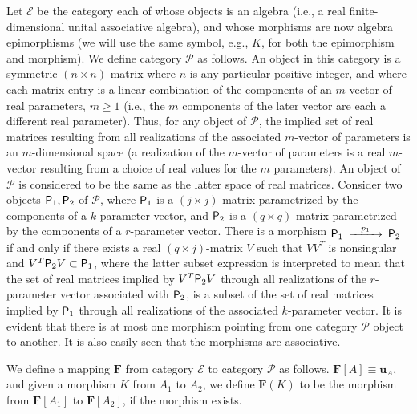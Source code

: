 \documentclass{amsart}
\numberwithin{equation}{section}
\theoremstyle{definition}
\numberwithin{theorem}{section}
\begin{document}
Let $\mathcal{E}$ be the category each of whose objects is an algebra (i.e., a real finite-dimensional unital associative algebra), and whose morphisms are now algebra epimorphisms (we will use the same symbol, e.g., $K$, for both the epimorphism and morphism).  We define category $\mathcal{P}$ as follows. An object in this category is a symmetric $(n\times n)$-matrix where $n$ is any particular positive integer, and where each matrix entry is a linear combination of the components of an $m$-vector of real parameters, $m\ge 1$ (i.e., the $m$ components of the later vector are each a different real parameter).  Thus, for any object of $\mathcal{P}$, the implied set of real matrices resulting from all realizations of the associated $m$-vector of parameters is an $m$-dimensional space (a realization of the $m$-vector of parameters is a real $m$-vector resulting from a choice of real values for the $m$ parameters).  An object of $\mathcal{P}$ is considered to be the same as the latter space of real matrices.  Consider two objects ${\sf P}_1,{\sf P}_2$ of $\mathcal{P}$, where ${\sf P}_1$ is a $(j\times j)$-matrix parametrized by the components of a $k$-parameter vector, and ${\sf P}_2$ is a $(q\times q)$-matrix parametrized by the components of a $r$-parameter vector.  There is a morphism $ \begin{CD}  {\sf P}_1 @>p_1>> {\sf P}_2\end{CD}$ if and only if  there exists a real $(q\times j)$-matrix $V$ such that $VV^T$ is nonsingular and $V^T{\sf P}_2V\subset {\sf P}_1$, where the latter subset expression is 
interpreted to mean that the set of real matrices implied by $V^T{\sf P}_2V$ through all realizations of the $r$-parameter vector associated with ${\sf P}_2$, is a subset of  the set of real matrices implied by  ${\sf P}_1$ through all realizations of the associated $k$-parameter vector.  It is evident that there is at most one morphism pointing from one category $\mathcal{P}$ object to another.  It is also easily seen that the morphisms are associative.  

We define a mapping $\mathbf{F}$ from category $\mathcal{E}$ to category $\mathcal{P}$ as follows.  $\mathbf{F}[
A] \equiv \mathbf{u}_A$, and given a morphism $K$ from $A_1$ to $A_2$, we define $\mathbf{F}(K)$ to be the morphism from $\mathbf{F}[A_1]$ to $\mathbf{F}[A_2]$, if the morphism exists.   
\end{document}
